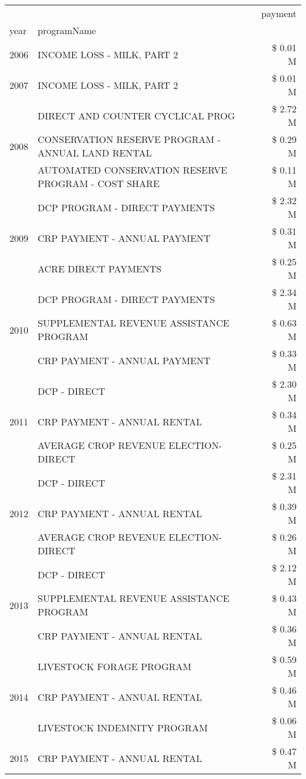 \begin{tabular}{llr}
\toprule
 &  & payment \\
year & programName &  \\
\midrule
2006 & INCOME LOSS - MILK, PART 2 & \$ 0.01 M \\
\cline{1-3}
2007 & INCOME LOSS - MILK, PART 2 & \$ 0.01 M \\
\cline{1-3}
\multirow[t]{3}{*}{2008} & DIRECT AND COUNTER CYCLICAL PROG & \$ 2.72 M \\
 & CONSERVATION RESERVE PROGRAM - ANNUAL LAND RENTAL & \$ 0.29 M \\
 & AUTOMATED CONSERVATION RESERVE PROGRAM - COST SHARE & \$ 0.11 M \\
\cline{1-3}
\multirow[t]{3}{*}{2009} & DCP PROGRAM - DIRECT PAYMENTS & \$ 2.32 M \\
 & CRP PAYMENT - ANNUAL PAYMENT & \$ 0.31 M \\
 & ACRE DIRECT PAYMENTS & \$ 0.25 M \\
\cline{1-3}
\multirow[t]{3}{*}{2010} & DCP PROGRAM - DIRECT PAYMENTS & \$ 2.34 M \\
 & SUPPLEMENTAL REVENUE ASSISTANCE PROGRAM & \$ 0.63 M \\
 & CRP PAYMENT - ANNUAL PAYMENT & \$ 0.33 M \\
\cline{1-3}
\multirow[t]{3}{*}{2011} & DCP - DIRECT & \$ 2.30 M \\
 & CRP PAYMENT - ANNUAL RENTAL & \$ 0.34 M \\
 & AVERAGE CROP REVENUE ELECTION-DIRECT & \$ 0.25 M \\
\cline{1-3}
\multirow[t]{3}{*}{2012} & DCP - DIRECT & \$ 2.31 M \\
 & CRP PAYMENT - ANNUAL RENTAL & \$ 0.39 M \\
 & AVERAGE CROP REVENUE ELECTION-DIRECT & \$ 0.26 M \\
\cline{1-3}
\multirow[t]{3}{*}{2013} & DCP - DIRECT & \$ 2.12 M \\
 & SUPPLEMENTAL REVENUE ASSISTANCE PROGRAM & \$ 0.43 M \\
 & CRP PAYMENT - ANNUAL RENTAL & \$ 0.36 M \\
\cline{1-3}
\multirow[t]{3}{*}{2014} & LIVESTOCK FORAGE PROGRAM & \$ 0.59 M \\
 & CRP PAYMENT - ANNUAL RENTAL & \$ 0.46 M \\
 & LIVESTOCK INDEMNITY PROGRAM & \$ 0.06 M \\
\cline{1-3}
\multirow[t]{3}{*}{2015} & CRP PAYMENT - ANNUAL RENTAL & \$ 0.47 M \\

\end{tabular}
